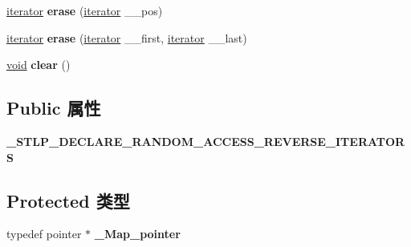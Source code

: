 \begin{DoxyCompactItemize}
\item 
\mbox{\label{classdeque_a0c84b0b6e601140132de6324489f0b4d}} 
\hyperlink{structiterator}{iterator} {\bfseries erase} (\hyperlink{structiterator}{iterator} \+\_\+\+\_\+pos)
\item 
\mbox{\label{classdeque_a745e68373354ed0bab1ed5edec114c01}} 
\hyperlink{structiterator}{iterator} {\bfseries erase} (\hyperlink{structiterator}{iterator} \+\_\+\+\_\+first, \hyperlink{structiterator}{iterator} \+\_\+\+\_\+last)
\item 
\mbox{\label{classdeque_acc5ec5ff14dce593a54256378d6bb15e}} 
\hyperlink{interfacevoid}{void} {\bfseries clear} ()
\end{DoxyCompactItemize}
\subsection*{Public 属性}
\begin{DoxyCompactItemize}
\item 
\mbox{\label{classdeque_a805d2c23d1fe9d32eeb97766216743db}} 
{\bfseries \+\_\+\+S\+T\+L\+P\+\_\+\+D\+E\+C\+L\+A\+R\+E\+\_\+\+R\+A\+N\+D\+O\+M\+\_\+\+A\+C\+C\+E\+S\+S\+\_\+\+R\+E\+V\+E\+R\+S\+E\+\_\+\+I\+T\+E\+R\+A\+T\+O\+RS}
\end{DoxyCompactItemize}
\subsection*{Protected 类型}
\begin{DoxyCompactItemize}
\item 
\mbox{\label{classdeque_a8ae6ed4374a5dd47a89d2e309cbbddfa}} 
typedef pointer $\ast$ {\bfseries \+\_\+\+Map\+\_\+pointer}
\end{DoxyCompactItemize}

